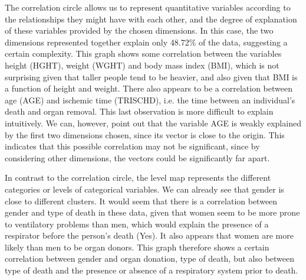 \documentclass[a4paper, 11pt]{article}
\begin{document}
\begin{multicols}{2}
The correlation circle allows us to represent quantitative variables according to the relationships they might have with each other, and the degree of explanation of these variables provided by the chosen dimensions. 
In this case, the two dimensions represented together explain only 48.72\% of the data, suggesting a certain complexity. 
This graph shows some correlation between the variables height (HGHT), weight (WGHT) and body mass index (BMI), which is not surprising given that taller people tend to be heavier, and also given that BMI is a function of height and weight. 
There also appears to be a correlation between age (AGE) and ischemic time (TRISCHD), i.e. the time between an individual's death and organ removal. 
This last observation is more difficult to explain intuitively. 
We can, however, point out that the variable AGE is weakly explained by the first two dimensions chosen, since its vector is close to the origin. 
This indicates that this possible correlation may not be significant, since by considering other dimensions, the vectors could be significantly far apart.

In contrast to the correlation circle, the level map represents the different categories or levels of categorical variables. 
We can already see that gender is close to different clusters. 
It would seem that there is a correlation between gender and type of death in these data, given that women seem to be more prone to ventilatory problems than men, which would explain the presence of a respirator before the person's death (Yes). 
It also appears that women are more likely than men to be organ donors. This graph therefore shows a certain correlation between gender and organ donation, type of death, but also between type of death and the presence or absence of a respiratory system prior to death.


\end{multicols}
\end{document}
